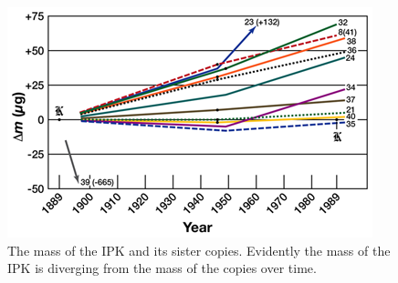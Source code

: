 \documentclass[aps,prstab,reprint,12pt]{revtex4-1}
\begin{document}


\begin{figure}[t]
    \centering
    \includegraphics[width=0.95\linewidth]{figs/ipk_mass_drift.png}
    \caption{The mass of the IPK and its sister copies. Evidently the mass of the IPK is diverging from the mass of the copies over time.}
    \label{fig:ipk_divergence}
\end{figure}


\end{document}
